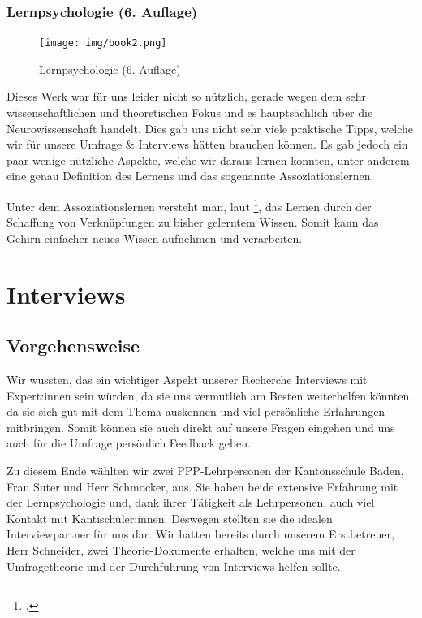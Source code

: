 \documentclass[12pt,a4paper]{report}
\begin{document}
\subsubsection{Lernpsychologie (6. Auflage)}
\begin{figure}[H]
    \centering
    \texttt{[image: img/book2.png]}
    \caption[Lernpsychologie (6. Auflage). Eigene Bildaufnahme.]{Lernpsychologie (6. Auflage)}
\end{figure}


Dieses Werk war für uns leider nicht so nützlich, gerade wegen dem sehr wissenschaftlichen und theoretischen Fokus und es hauptsächlich über die Neurowissenschaft handelt.
Dies gab uns nicht sehr viele praktische Tipps, welche wir für unsere Umfrage \& Interviews hätten brauchen können. 
Es gab jedoch ein paar wenige nützliche Aspekte, welche wir daraus lernen konnten, unter anderem eine genau Definition des Lernens und das sogenannte Assoziationslernen.

Unter dem Assoziationslernen versteht man, laut \footcite{Book2}, das Lernen durch der Schaffung von Verknüpfungen zu bisher gelerntem Wissen. 
Somit kann das Gehirn einfacher neues Wissen aufnehmen und verarbeiten.

\section{Interviews}

\subsection {Vorgehensweise}
Wir wussten, das ein wichtiger Aspekt unserer Recherche Interviews mit Expert:innen sein würden, da sie uns vermutlich am Besten weiterhelfen könnten, da sie sich gut mit dem Thema auskennen und viel persönliche Erfahrungen mitbringen.
Somit können sie auch direkt auf unsere Fragen eingehen und uns auch für die Umfrage persönlich Feedback geben. 

Zu diesem Ende wählten wir zwei PPP-Lehrpersonen der Kantonsschule Baden, Frau Suter und Herr Schmocker, aus. Sie haben beide extensive Erfahrung mit der Lernpsychologie und, dank ihrer Tätigkeit als Lehrpersonen, auch viel Kontakt mit Kantischüler:innen.
Deswegen stellten sie die idealen Interviewpartner für uns dar. Wir hatten bereits durch unserem Erstbetreuer, Herr Schneider, zwei Theorie-Dokumente erhalten, welche uns mit der Umfragetheorie und der Durchführung von Interviews helfen sollte.
\end{document}
